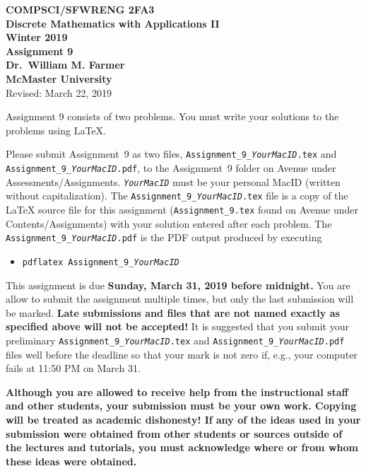 \documentclass[11pt,fleqn]{article}
\begin{document}
\begin{center}

  {\large \textbf{COMPSCI/SFWRENG 2FA3}}\\[2mm]
  {\large \textbf{Discrete Mathematics with Applications II}}\\[2mm]
  {\large \textbf{Winter 2019}}\\[8mm]
  {\huge \textbf{Assignment 9}}\\[6mm]
  {\large \textbf{Dr.~William M. Farmer}}\\[2mm]
  {\large \textbf{McMaster University}}\\[6mm]
  {\large Revised: March 22, 2019}

\end{center}

\medskip

Assignment 9 consists of two problems.  You must write your solutions
to the problems using LaTeX.

Please submit Assignment~9 as two files,
\texttt{Assignment\_9\_\emph{YourMacID}.tex} and
\texttt{Assignment\_9\_\emph{YourMacID}.pdf}, to the Assignment~9
folder on Avenue under Assessments/Assignments.
\texttt{\emph{YourMacID}} must be your personal MacID (written without
capitalization).  The \texttt{Assignment\_9\_\emph{YourMacID}.tex}
file is a copy of the LaTeX source file for this assignment
(\texttt{Assignment\_9.tex} found on Avenue under
Contents/Assignments) with your solution entered after each problem.
The \texttt{Assignment\_9\_\emph{YourMacID}.pdf} is the PDF output
produced by executing

\begin{itemize}

  \item[] \texttt{pdflatex Assignment\_9\_\emph{YourMacID}}

\end{itemize}

This assignment is due \textbf{Sunday, March 31, 2019 before
  midnight.}  You are allow to submit the assignment multiple times,
but only the last submission will be marked.  \textbf{Late submissions
  and files that are not named exactly as specified above will not be
  accepted!}  It is suggested that you submit your preliminary
\texttt{Assignment\_9\_\emph{YourMacID}.tex} and
\texttt{Assignment\_9\_\emph{YourMacID}.pdf} files well before the
deadline so that your mark is not zero if, e.g., your computer fails
at 11:50 PM on March 31.

\textbf{Although you are allowed to receive help from the
  instructional staff and other students, your submission must be your
  own work.  Copying will be treated as academic dishonesty! If any of
  the ideas used in your submission were obtained from other students
  or sources outside of the lectures and tutorials, you must
  acknowledge where or from whom these ideas were obtained.}
\end{document}
